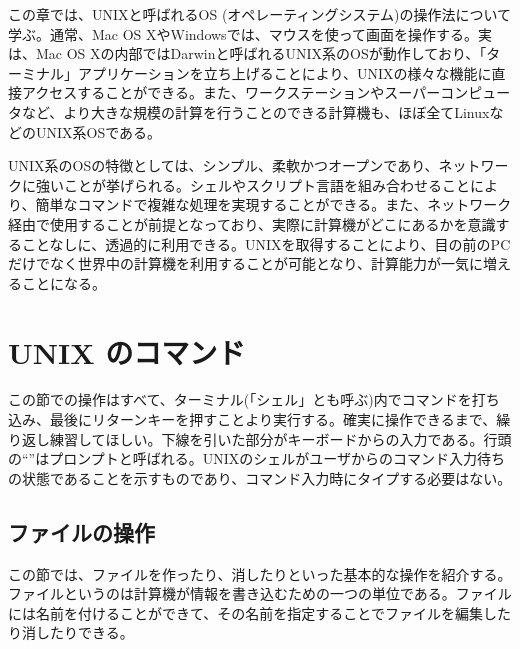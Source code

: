 
この章では、UNIXと呼ばれるOS (オペレーティングシステム)の操作法について学ぶ。通常、Mac OS XやWindowsでは、マウスを使って画面を操作する。実は、Mac OS Xの内部ではDarwinと呼ばれるUNIX系のOSが動作しており、「ターミナル」アプリケーションを立ち上げることにより、UNIXの様々な機能に直接アクセスすることができる。また、ワークステーションやスーパーコンピュータなど、より大きな規模の計算を行うことのできる計算機も、ほぼ全てLinuxなどのUNIX系OSである。

UNIX系のOSの特徴としては、シンプル、柔軟かつオープンであり、ネットワークに強いことが挙げられる。シェルやスクリプト言語を組み合わせることにより、簡単なコマンドで複雑な処理を実現することができる。また、ネットワーク経由で使用することが前提となっており、実際に計算機がどこにあるかを意識することなしに、透過的に利用できる。UNIXを取得することにより、目の前のPCだけでなく世界中の計算機を利用することが可能となり、計算能力が一気に増えることになる。

\section{UNIX のコマンド}

この節での操作はすべて、ターミナル(「シェル」とも呼ぶ)内でコマンドを打ち込み、最後にリターンキーを押すことより実行する。確実に操作できるまで、繰り返し練習してほしい。下線を引いた部分がキーボードからの入力である。行頭の``\texttt {\promptn}''はプロンプトと呼ばれる。UNIXのシェルがユーザからのコマンド入力待ちの状態であることを示すものであり、コマンド入力時にタイプする必要はない。

\subsection{ファイルの操作}
\label{sec:unix:fileManagement}
この節では、ファイルを作ったり、消したりといった基本的な操作を紹介する。ファイルというのは計算機が情報を書き込むための一つの単位である。ファイルには名前を付けることができて、その名前を指定することでファイルを編集したり消したりできる。


